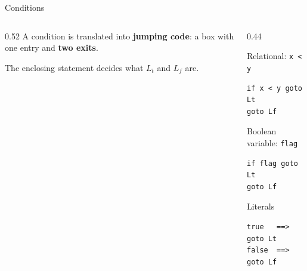 \documentclass[aspectratio=169]{beamer}
\newcommand{\tc}[1]{\texttt{#1}}
\begin{document}
\begin{frame}[fragile]{Conditions}
  \begin{columns}[T]
    \begin{column}{0.52\textwidth}
A condition is translated into \textbf{jumping code}:
      a box with one entry and \textbf{two exits}.
      \begin{center}
      \end{center}
      The enclosing statement decides what $L_t$ and $L_f$ are.
    \end{column}
    \begin{column}{0.44\textwidth}
      \begin{block}{Relational: \tc{x < y}}
        \begin{verbatim}
if x < y goto Lt
goto Lf
        \end{verbatim}
      \end{block}
      \begin{block}{Boolean variable: \tc{flag}}
        \begin{verbatim}
if flag goto Lt
goto Lf
        \end{verbatim}
      \end{block}
      \begin{block}{Literals}
        \begin{verbatim}
true   ==>  goto Lt
false  ==>  goto Lf
        \end{verbatim}
      \end{block}
    \end{column}
  \end{columns}
\end{frame}
\end{document}
